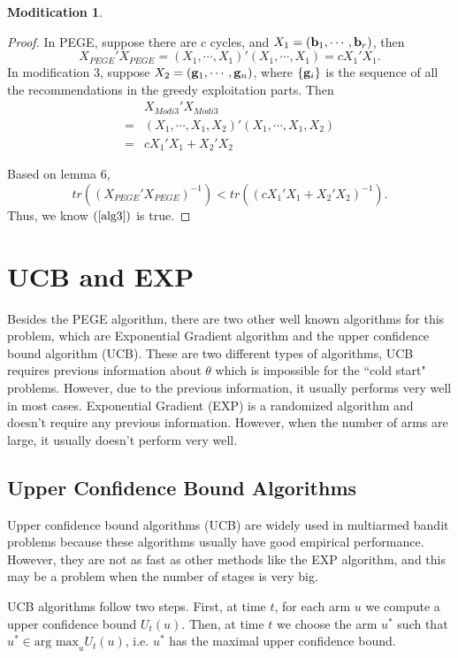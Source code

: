 \documentclass{article}
\theoremstyle{plain}
\theoremstyle{definition}
\newtheorem{modification}{Moditication}
\begin{document}
\begin{modification}
\begin{proof}
In PEGE, suppose there are $c$ cycles, and $X_1=(\bold{b}_1,\cdots,\bold{b}_r)$, then 
\[X_{PEGE}'X_{PEGE}=(X_1,\cdots,X_1)'(X_1,\cdots,X_1)=cX_1'X_1.\]
In modification 3, suppose $X_2=(\bold{g}_1,\cdots,\bold{g}_n)$, where $\{\bold{g}_i\}$ is the sequence of all the recommendations in the greedy exploitation parts. Then
\begin{align*}
&X_{Modi3}'X_{Modi3}\\
=&(X_1,\cdots,X_1,X_2)'(X_1,\cdots,X_1,X_2)\\
=&cX_1'X_1+X_2'X_2
\end{align*}

Based on  lemma 6, \[tr((X_{PEGE}'X_{PEGE})^{-1})<tr((cX_1'X_1+X_2'X_2)^{-1}).\]
Thus, we know $(\ref{alg3})$ is true.
\end{proof}


\end{modification}


\section{UCB and EXP}
Besides the PEGE algorithm, there are two other well known algorithms for this problem, which are Exponential Gradient algorithm and the upper confidence bound algorithm (UCB). These are two different types of algorithms, UCB requires previous information about $\theta$ which is impossible for the ``cold start" problems. However, due to the previous information, it usually performs very well in most cases. Exponential Gradient (EXP) is a randomized algorithm and doesn't require any previous information. However, when the number of arms are large, it usually doesn't perform very well.



\subsection{Upper Confidence Bound Algorithms}

Upper confidence bound algorithms (UCB) are widely used in multiarmed
bandit problems because these algorithms usually have good empirical performance. 
However, they are not as fast as other methods like the EXP algorithm, and this may be a problem
when the number of stages is very big.

UCB algorithms follow two steps. First, at time $t$, for each arm
$u$ we compute a upper confidence bound $U_{t}\left(u\right)$. Then,
at time $t$ we choose the arm $u^{*}$ such that $u^{*}\in\mbox{arg max}_{u}U_{t}\left(u\right)$,
i.e. $u^{*}$ has the maximal upper confidence bound. 
\end{document}
